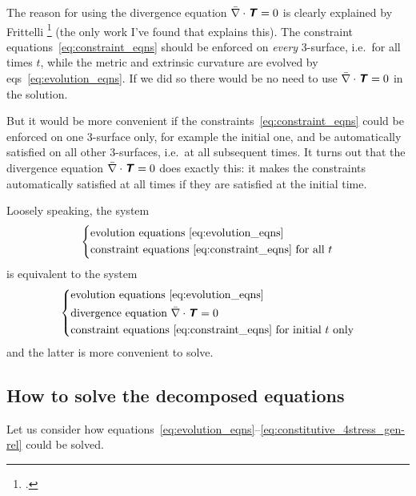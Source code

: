 \documentclass[\ifafour a4paper,12pt,\else a5paper,10pt,\fi%
onecolumn,oneside,article,%
british%
]{memoir}
\theoremstyle{remark}
\theoremstyle{innote}
\newcommand*{\mathte}[1]{\textbf{\textit{\textsf{#1}}}}
\newcommand*{\citey}{\footcites}%
\newcommand*{\incr}{\triangle}%
\renewcommand*{\|}{\nonscript\,\vert\nonscript\;\mathopen{}}
\newcommand*{\eqns}{eqs}%
\newcommand*{\ie}{{i.e.}}
\newcommand*{\ydd}{\rho}
\newcommand*{\yd}{\ydd}
\newcommand*{\yTTf}{T}
\newcommand*{\yTf}{\mathte{\yTTf}}
\newcommand*{\ygg}{g}
\newcommand*{\yg}{\mathte{\ygg}}
\newcommand*{\yKK}{K}
\newcommand*{\yK}{\mathte{\yKK}}
\newcommand*{\ynaf}{\Bar{\nabla}}
\begin{document}
The reason for using the divergence equation $\ynaf\cdot\yTf = 0$ is
clearly explained by Frittelli \citey{frittelli1997} (the only work I've
found that explains this). The constraint
equations~\eqref{eq:constraint_eqns} should be enforced on \emph{every}
3-surface, \ie\ for all times $t$, while the metric and extrinsic curvature
are evolved by \eqns~\eqref{eq:evolution_eqns}. If we did so there would be
no need to use $\ynaf\cdot\yTf = 0$ in the solution.

But it would be more convenient if the
constraints~\eqref{eq:constraint_eqns} could be enforced on one 3-surface
only, for example the initial one, and be automatically satisfied on all
other 3-surfaces, \ie\ at all subsequent times. It turns out that the
divergence equation $\ynaf\cdot\yTf = 0$ does exactly this: it makes the
constraints automatically satisfied at all times if they are satisfied at
the initial time.

Loosely speaking, the system
\begin{equation*}
  \left\{\begin{aligned}
  &\text{evolution equations~\eqref{eq:evolution_eqns}} \\
  &\text{constraint equations~\eqref{eq:constraint_eqns} for all $t$}
  \end{aligned}\right.
\end{equation*}
is equivalent to the system
\begin{equation*}
  \left\{\begin{aligned}
  &\text{evolution equations~\eqref{eq:evolution_eqns}} \\
  &\text{divergence equation $\ynaf\cdot\yTf = 0$} \\
  &\text{constraint equations~\eqref{eq:constraint_eqns} for initial $t$ only}
  \end{aligned}\right.
\end{equation*}
and the latter is more convenient to solve.


\subsection{How to solve the decomposed equations}
\label{sec:how_to_solve_3-1}

Let us consider how
equations~\eqref{eq:evolution_eqns}--\eqref{eq:constitutive_4stress_gen-rel}
could be solved.

\end{document}

